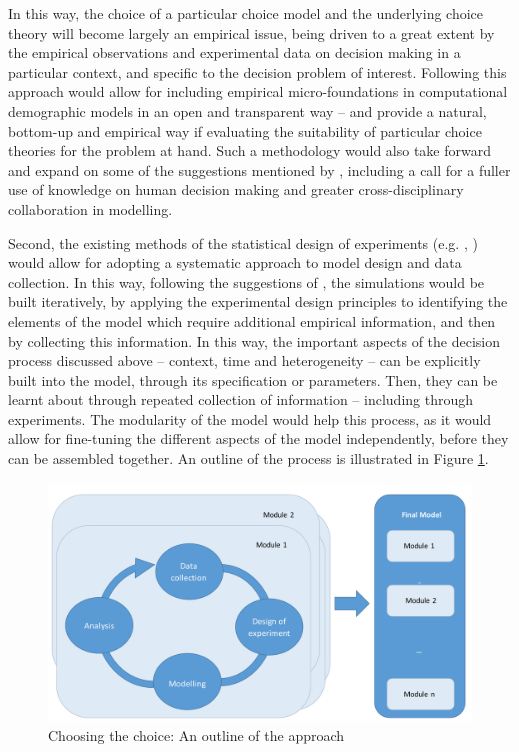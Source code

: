 \documentclass{article}
\begin{document}
In this way, the choice of a particular choice model and the underlying choice theory will become largely an empirical issue, being driven to a great extent by the empirical observations and experimental data on decision making in a particular context, and specific to the decision problem of interest. Following this approach would allow for including empirical micro-foundations in computational demographic models in an open and transparent way -- and provide a natural, bottom-up and empirical way if evaluating the suitability of particular choice theories for the problem at hand. Such a methodology would also take forward and expand on some of the suggestions mentioned by \citet{Groeneveld}, including a call for a fuller use of knowledge on human decision making and greater cross-disciplinary collaboration in modelling.

Second, the existing methods of the statistical design of experiments (e.g. \citeauthor{Chaloner} \citeyear{Chaloner}, \citeauthor{Kleijnen2000} \citeyear{Kleijnen2000}) would allow for adopting a systematic approach to model design and data collection. In this way, following the suggestions of \citet{Courgeau}, the simulations would be built iteratively, by applying the experimental design principles to identifying the elements of the model which require additional empirical information, and then by collecting this information.  In this way, the important aspects of the decision process discussed above – context, time and heterogeneity – can be explicitly built into the model, through its specification or parameters. Then, they can be learnt about through repeated collection of information – including through experiments. The modularity of the model would help this process, as it would allow for fine-tuning the different aspects of the model independently, before they can be assembled together. An outline of the process is illustrated in Figure \ref{fig:approach}.

\begin{figure}
\includegraphics[width=\textwidth]{process}
\caption{Choosing the choice: An outline of the approach \label{fig:approach}}
\end{figure}
\end{document}
